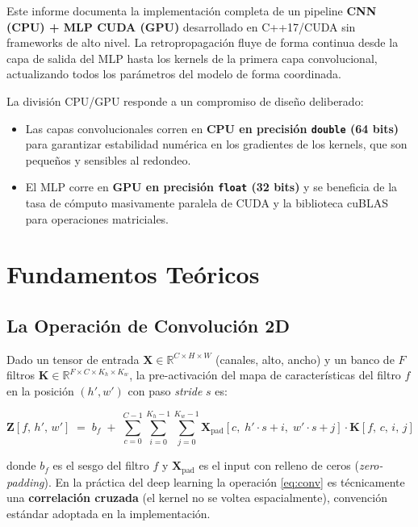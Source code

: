 \documentclass[12pt,a4paper]{article}
\newcommand{\R}{\mathbb{R}}
\begin{document}
Este informe documenta la implementación completa de un pipeline
\textbf{CNN (CPU) + MLP CUDA (GPU)} desarrollado en C++17/CUDA sin frameworks de alto nivel.
La retropropagación fluye de forma continua desde la capa de salida del MLP hasta los kernels
de la primera capa convolucional, actualizando todos los parámetros del modelo de forma
coordinada.

La división CPU/GPU responde a un compromiso de diseño deliberado:
\begin{itemize}[noitemsep]
  \item Las capas convolucionales corren en \textbf{CPU en precisión \texttt{double} (64 bits)}
    para garantizar estabilidad numérica en los gradientes de los kernels, que son pequeños
    y sensibles al redondeo.
  \item El MLP corre en \textbf{GPU en precisión \texttt{float} (32 bits)} y se beneficia
    de la tasa de cómputo masivamente paralela de CUDA y la biblioteca cuBLAS para
    operaciones matriciales.
\end{itemize}

\section{Fundamentos Teóricos}

\subsection{La Operación de Convolución 2D}

Dado un tensor de entrada $\mathbf{X} \in \R^{C \times H \times W}$ (canales, alto, ancho)
y un banco de $F$ filtros $\mathbf{K} \in \R^{F \times C \times K_h \times K_w}$, la
pre-activación del mapa de características del filtro $f$ en la posición $(h', w')$
con paso \textit{stride} $s$ es:

\begin{equation}
  \mathbf{Z}[f,\, h',\, w'] \;=\; b_f \;+\;
  \sum_{c=0}^{C-1} \sum_{i=0}^{K_h-1} \sum_{j=0}^{K_w-1}
  \mathbf{X}_{\mathrm{pad}}[c,\; h'\!\cdot s + i,\; w'\!\cdot s + j]
  \cdot \mathbf{K}[f,\, c,\, i,\, j]
  \label{eq:conv}
\end{equation}

donde $b_f$ es el sesgo del filtro $f$ y $\mathbf{X}_{\mathrm{pad}}$ es el input con
relleno de ceros (\textit{zero-padding}). En la práctica del deep learning la operación
\eqref{eq:conv} es técnicamente una \textbf{correlación cruzada} (el kernel no se voltea
espacialmente), convención estándar adoptada en la implementación.
\end{document}
